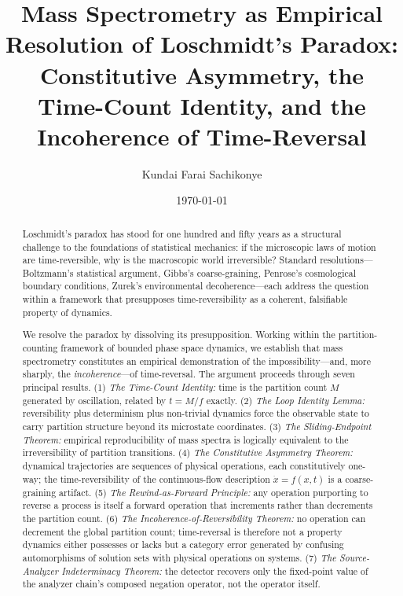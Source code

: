 \documentclass[twocolumn,10pt,a4paper]{article}
\theoremstyle{definition}
\theoremstyle{remark}
\newcommand{\Mcount}{M}
\begin{document}
\title{\textbf{Mass Spectrometry as Empirical Resolution of Loschmidt's Paradox: \\
Constitutive Asymmetry, the Time-Count Identity, and the Incoherence of Time-Reversal}}

\author[1]{Kundai Farai Sachikonye}

\date{\today}

\maketitle

\begin{abstract}
\noindent Loschmidt's paradox has stood for one hundred and fifty years as a structural challenge to the foundations of statistical mechanics: if the microscopic laws of motion are time-reversible, why is the macroscopic world irreversible? Standard resolutions---Boltzmann's statistical argument, Gibbs's coarse-graining, Penrose's cosmological boundary conditions, Zurek's environmental decoherence---each address the question within a framework that presupposes time-reversibility as a coherent, falsifiable property of dynamics.

\vspace{0.2cm}
\noindent We resolve the paradox by dissolving its presupposition. Working within the partition-counting framework of bounded phase space dynamics, we establish that mass spectrometry constitutes an empirical demonstration of the impossibility---and, more sharply, the \emph{incoherence}---of time-reversal. The argument proceeds through seven principal results. (1) \emph{The Time-Count Identity:} time is the partition count $\Mcount$ generated by oscillation, related by $t = \Mcount/f$ exactly. (2) \emph{The Loop Identity Lemma:} reversibility plus determinism plus non-trivial dynamics force the observable state to carry partition structure beyond its microstate coordinates. (3) \emph{The Sliding-Endpoint Theorem:} empirical reproducibility of mass spectra is logically equivalent to the irreversibility of partition transitions. (4) \emph{The Constitutive Asymmetry Theorem:} dynamical trajectories are sequences of physical operations, each constitutively one-way; the time-reversibility of the continuous-flow description $\dot{x} = f(x,t)$ is a coarse-graining artifact. (5) \emph{The Rewind-as-Forward Principle:} any operation purporting to reverse a process is itself a forward operation that increments rather than decrements the partition count. (6) \emph{The Incoherence-of-Reversibility Theorem:} no operation can decrement the global partition count; time-reversal is therefore not a property dynamics either possesses or lacks but a category error generated by confusing automorphisms of solution sets with physical operations on systems. (7) \emph{The Source-Analyzer Indeterminacy Theorem:} the detector recovers only the fixed-point value of the analyzer chain's composed negation operator, not the operator itself.


\end{abstract}
\end{document}
